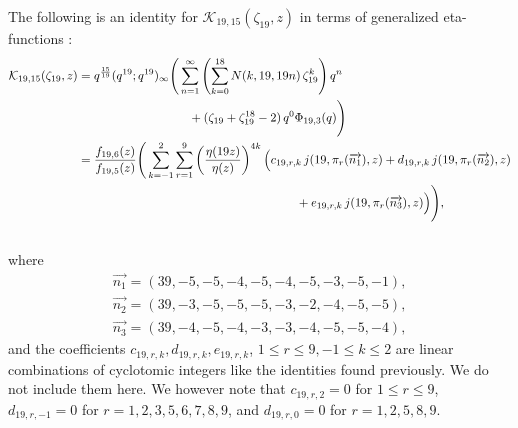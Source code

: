 \documentclass[12pt]{amsart}
\theoremstyle{definition}
\theoremstyle{remark}
\numberwithin{equation}{section}
\newcommand\Lpar[1]{\left(#1\right)}
\begin{document}
The following is an identity for $\mathcal{K}_{19,15}(\zeta_{19},z)$ in terms of generalized eta-functions :
\\
\begin{align}
\mathcal{K}_{19,15}(\zeta_{19},z)&=q^\frac{15}{19}(q^{19};q^{19})_\infty \Bigg(\sum_{n=1}^\infty \Lpar{\sum_{k=0}^{18} N(k,19,19n)\,\zeta_{19}^k}q^n \label{eq:rank19id2} \\
&\hspace{32mm}+(\zeta_{19}+\zeta_{19}^{18}-2)\,q^{0} \Phi_{19,3}(q)\Bigg)
\nonumber
\\
&=\frac{f_{19,6}(z)}{f_{19,5}(z)}\Bigg(\sum_{k=-1}^{2}\sum_{r=1}^{9} \left(\dfrac{\eta(19z)}{\eta(z)}\right)^{4k}\Big(c_{19,r,k}\,j(19,\pi_r(\overrightarrow{n_1}),z)+d_{19,r,k}\,j(19,\pi_r(\overrightarrow{n_2}),z)
\\
\nonumber
&\hspace{63mm}+e_{19,r,k}\,j(19,\pi_r(\overrightarrow{n_3}),z)\Big)\Bigg),
\nonumber
\\
\nonumber
\end{align}
where\\
\begin{align*}
\overrightarrow{n_1}=(39, -5, -5, -4, -5, -4, -5, -3, -5, -1),
\\
\overrightarrow{n_2}=(39, -3, -5, -5, -5, -3, -2, -4, -5, -5),
\\
\overrightarrow{n_3}=(39, -4, -5, -4, -3, -3, -4, -5, -5, -4),
\end{align*}
and the coefficients $c_{19,r,k}, d_{19,r,k}, e_{19,r,k}$, $1\leq r \leq 9, -1\leq k \leq 2$ are linear combinations of cyclotomic integers like the identities found previously. We do not include them here. We however note that $c_{19,r,2}=0$ for $1 \leq r \leq 9$, $d_{19,r,-1}=0$ for $r=1,2,3,5,6,7,8,9$, and $d_{19,r,0}=0$ for $r=1,2,5,8,9$. 
\\\\
\end{document}
